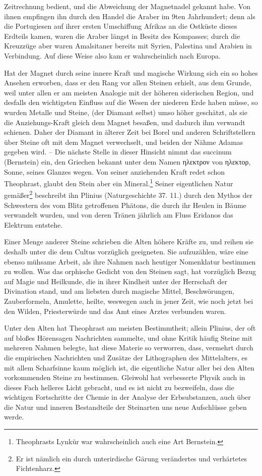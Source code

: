 \documentclass[a4paper, 11pt, oneside, polutonikogreek, german]{article}
\begin{document}
Zeitrechnung bedient, und die Abweichung der Magnetnadel gekannt habe. Von ihnen empfingen ihn durch den Handel die Araber im 9ten Jahrhundert; denn als die Portugiesen auf ihrer ersten Umschiffung Afrikas an die Ostküste dieses Erdteils kamen, waren die Araber längst in Besitz des Kompasses; durch die Kreuzzüge aber waren Amalsitaner bereits mit Syrien, Palestina und Arabien in Verbindung. Auf diese Weise also kam er wahrscheinlich nach Europa.

Hat der Magnet durch seine innere Kraft und magische Wirkung sich ein so hohes Ansehen erworben, dass er den Rang vor allen Steinen erhielt, aus dem Grunde, weil unter allen er am meisten Analogie mit der höheren siderischen Region, und desfalls den wichtigsten Einfluss auf die Wesen der niederen Erde haben müsse, so wurden Metalle und Steine, (der Diamant selbst) umso höher geschätzt, als sie die Anziehungs-Kraft gleich dem Magnet besaßen, und dadurch ihm verwandt schienen. Daher der Diamant in älterer Zeit bei Borel und anderen Schriftstellern über Steine oft mit dem Magnet verwechselt, und beiden der Nähme Adamas gegeben wird. -- Die nächste Stelle in dieser Hinsicht nimmt das succinum (Bernstein) ein, den Griechen bekannt unter dem Namen ηλεκτρον von ηλεκτορ, Sonne, seines Glanzes wegen. Von seiner anziehenden Kraft redet schon Theophrast, glaubt den Stein aber ein Mineral.\footnote{Theophrasts Lynkür war wahrscheinlich auch eine Art Bernstein.} Seiner eigentlichen Natur gemäßer\footnote{Er ist nämlich ein durch unterirdische Gärung verändertes und verhärtetes Fichtenharz.} beschreibt ihn Plinius (Naturgeschichte 37. 11.) durch den Mythos der Schwestern des vom Blitz getroffenen Phätons, die durch ihr Heulen in Bäume verwandelt wurden, und von deren Tränen jährlich am Fluss Eridanos das Elektrum entstehe.

Einer Menge anderer Steine schrieben die Alten höhere Kräfte zu, und reihen sie deshalb unter die dem Cultus vorzüglich geeigneten. Sie aufzuzählen, wäre eine ebenso mühsame Arbeit, als ihre Nahmen nach heutiger Nomenklatur bestimmen zu wollen. Was das orphische Gedicht von den Steinen sagt, hat vorzüglich Bezug auf Magie und Heilkunde, die in ihrer Kindheit unter der Herrschaft der Divination stand, und am liebsten durch magische Mittel, Beschwörungen, Zauberformeln, Amulette, heilte, weswegen auch in jener Zeit, wie noch jetzt bei den Wilden, Priesterwürde und das Amt eines Arztes verbunden waren.

Unter den Alten hat Theophrast am meisten Bestimmtheit; allein Plinius, der oft auf bloßes Hörensagen Nachrichten sammelte, und ohne Kritik häufig Steine mit mehreren Nahmen belegte, hat diese Materie so verworren, dass, vermehrt durch die empirischen Nachrichten und Zusätze der Lithographen des Mittelalters, es mit allem Scharfsinne kaum möglich ist, die eigentliche Natur aller bei den Alten vorkommenden Steine zu bestimmen. Gleiwohl hat verbesserte Physik auch in dieses Fach helleres Licht gebracht, und es ist nicht zu bezweifeln, dass die wichtigen Fortschritte der Chemie in der Analyse der Erbsubstanzen, auch über die Natur und inneren Bestandteile der Steinarten uns neue Aufschlüsse geben werde.
\end{document}
